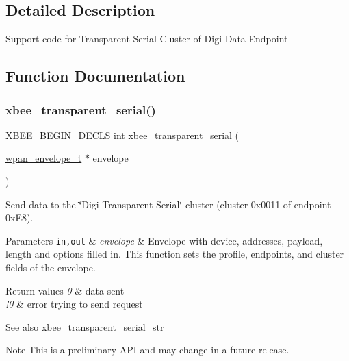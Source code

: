 \subsection{Detailed Description}
\begin{DoxyVerb}  Support code for Transparent Serial Cluster of Digi Data Endpoint\end{DoxyVerb}
 



\subsection{Function Documentation}
\mbox{\label{group__xbee__transparent_gafbf9e5ccdb17be373012bd690a76e570}} 
\subsubsection{\texorpdfstring{xbee\+\_\+transparent\+\_\+serial()}{xbee\_transparent\_serial()}}
{\footnotesize\ttfamily \hyperlink{group__hal_ga336bff4f4a6012aacc4468132bbd3d7f}{X\+B\+E\+E\+\_\+\+B\+E\+G\+I\+N\+\_\+\+D\+E\+C\+LS} int xbee\+\_\+transparent\+\_\+serial (\begin{DoxyParamCaption}\item[{\hyperlink{structwpan__envelope__t}{wpan\+\_\+envelope\+\_\+t} $\ast$}]{envelope }\end{DoxyParamCaption})}



Send data to the \char`\"{}\+Digi Transparent Serial\char`\"{} cluster (cluster 0x0011 of endpoint 0x\+E8). 


\begin{DoxyParams}[1]{Parameters}
\mbox{\tt in,out}  & {\em envelope} & Envelope with device, addresses, payload, length and options filled in. This function sets the profile, endpoints, and cluster fields of the envelope.\\
\hline
\end{DoxyParams}

\begin{DoxyRetVals}{Return values}
{\em 0} & data sent \\
\hline
{\em !0} & error trying to send request\\
\hline
\end{DoxyRetVals}
\begin{DoxySeeAlso}{See also}
\hyperlink{group__xbee__transparent_ga93c58cb71320437497c8aa9b3fca3f35}{xbee\+\_\+transparent\+\_\+serial\+\_\+str}
\end{DoxySeeAlso}
\begin{DoxyNote}{Note}
This is a preliminary A\+PI and may change in a future release. 
\end{DoxyNote}


